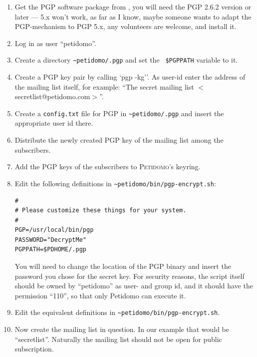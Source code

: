 \documentclass[a4paper]{report}
\newcommand{\Petidomo}{{\scshape Peti\-domo}}
\newcommand{\file}[1]{{\tt #1}}
\begin{document}
\begin{enumerate}

\item Get the PGP software package from
, you
will need the PGP 2.6.2 version or later --- 5.x won't work, as far as
I know, maybe someone wants to adapt the PGP-mechanism to PGP 5.x, any
volunteers are welcome, and install it.

\item Log in as user ``petidomo''.

\item Create a directory \file{\~{}petidomo/.pgp} and set the {\tt
\$PGPPATH} variable to it.

\item Create a PGP key pair by calling `pgp -kg''. As user-id enter
the address of the mailing list itself, for example: ``The secret
mailing list $<$secretlist@petidomo.com$>$''.

\item Create a \file{config.txt} file for PGP in
\file{\~{}petidomo/.pgp} and insert the appropriate user id there.

\item Distribute the newly created PGP key of the mailing list among
the subscribers.

\item Add the PGP keys of the subscribers to \Petidomo's keyring.

\item Edit the following definitions in
\file{\~{}petidomo/bin/pgp-encrypt.sh}:

\begin{verbatim}
#
# Please customize these things for your system.
#
PGP=/usr/local/bin/pgp
PASSWORD="DecryptMe"
PGPPATH=$PDHOME/.pgp
\end{verbatim}

You will need to change the location of the PGP binary and insert the
password you chose for the secret key. For security reasons, the
script itself should be owned by ``petidomo'' as user- and group id,
and it should have the permission ``110'', so that only Petidomo can
execute it.

\item Edit the equivalent definitions in
\file{\~{}petidomo/bin/pgp-encrypt.sh}.

\item Now create the mailing list in question. In our example that
would be ``secretlist''. Naturally the mailing list should not be open
for public subscription.


\end{enumerate}
\end{document}
